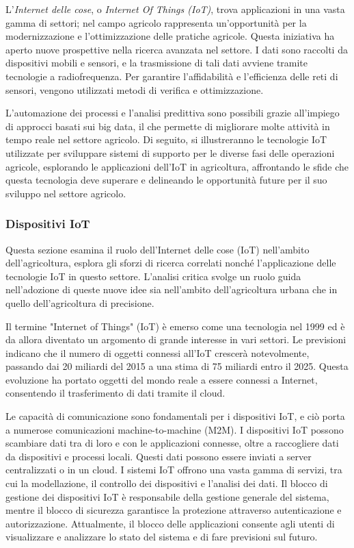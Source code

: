 L'\textit{Internet delle cose}, o \textit{Internet Of Things (IoT)}, trova applicazioni in una vasta gamma di settori; nel campo agricolo rappresenta un'opportunità per la modernizzazione e l'ottimizzazione delle pratiche agricole. Questa iniziativa ha aperto nuove prospettive nella ricerca avanzata nel settore. I dati sono raccolti da dispositivi mobili e sensori, e la trasmissione di tali dati avviene tramite tecnologie a radiofrequenza. Per garantire l'affidabilità e l'efficienza delle reti di sensori, vengono utilizzati metodi di verifica e ottimizzazione.

L'automazione dei processi e l'analisi predittiva sono possibili grazie all'impiego di approcci basati sui big data, il che permette di migliorare molte attività in tempo reale nel settore agricolo. Di seguito, si illustreranno le tecnologie IoT utilizzate per sviluppare sistemi di supporto per le diverse fasi delle operazioni agricole, esplorando le applicazioni dell'IoT in agricoltura, affrontando le sfide che questa tecnologia deve superare e delineando le opportunità future per il suo sviluppo nel settore agricolo.

\subsubsection{Dispositivi IoT}

Questa sezione esamina il ruolo dell'Internet delle cose (IoT) nell'ambito dell'agricoltura, esplora gli sforzi di ricerca correlati nonché l'applicazione delle tecnologie IoT in questo settore. L'analisi critica svolge un ruolo guida nell'adozione di queste nuove idee sia nell'ambito dell'agricoltura urbana che in quello dell'agricoltura di precisione.

Il termine "Internet of Things" (IoT) è emerso come una tecnologia nel 1999 ed è da allora diventato un argomento di grande interesse in vari settori. Le previsioni indicano che il numero di oggetti connessi all'IoT crescerà notevolmente, passando dai 20 miliardi del 2015 a una stima di 75 miliardi entro il 2025. Questa evoluzione ha portato oggetti del mondo reale a essere connessi a Internet, consentendo il trasferimento di dati tramite il cloud.

Le capacità di comunicazione sono fondamentali per i dispositivi IoT, e ciò porta a numerose comunicazioni machine-to-machine (M2M). I dispositivi IoT possono scambiare dati tra di loro e con le applicazioni connesse, oltre a raccogliere dati da dispositivi e processi locali. Questi dati possono essere inviati a server centralizzati o in un cloud. I sistemi IoT offrono una vasta gamma di servizi, tra cui la modellazione, il controllo dei dispositivi e l'analisi dei dati. Il blocco di gestione dei dispositivi IoT è responsabile della gestione generale del sistema, mentre il blocco di sicurezza garantisce la protezione attraverso autenticazione e autorizzazione. Attualmente, il blocco delle applicazioni consente agli utenti di visualizzare e analizzare lo stato del sistema e di fare previsioni sul futuro.

